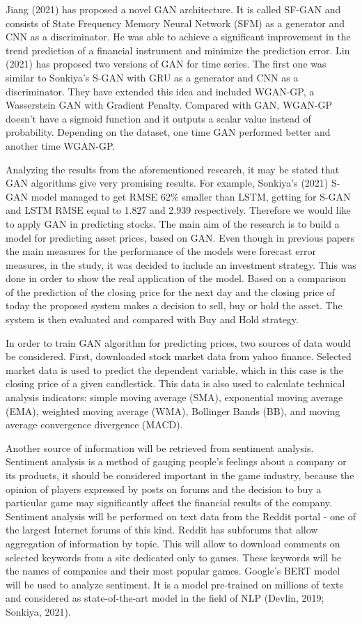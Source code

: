 \documentclass[11pt]{article} %
\begin{document}
Jiang (2021) has proposed a novel GAN architecture. It is called SF-GAN and consists of 
State Frequency Memory Neural Network (SFM) as a generator and CNN as a discriminator. 
He was able to achieve a significant improvement in the trend prediction of a financial instrument and minimize the prediction error.  Lin (2021) has proposed two versions of GAN for time series. The first one was similar to Sonkiya's S-GAN with GRU as a generator and CNN as a discriminator. They have extended this idea and included WGAN-GP, a Wasserstein GAN with Gradient Penalty. Compared with GAN, WGAN-GP doesn't have a sigmoid function and it outputs a scalar value instead of probability. Depending on the dataset, one time GAN performed better and another time WGAN-GP.

Analyzing the results from the aforementioned research, it may be stated that GAN algorithms give very promising results. For example, Sonkiya's (2021) S-GAN model managed to get RMSE 62$\% $ smaller than LSTM, getting for S-GAN and LSTM RMSE equal to 1.827 and 2.939 respectively. Therefore we would like to apply GAN in predicting stocks. The main aim of the research is to build a model for predicting asset prices, based on GAN. Even though in previous papers the main measures for the performance of the models were forecast error measures, in the study, it was decided to include an investment strategy. This was done in order to show the real application of the model. Based on a comparison of the prediction of the closing price for the next day and the closing price of today the proposed system makes a decision to sell, buy or hold the asset. The system is then evaluated and compared with Buy and Hold strategy.

In order to train GAN algorithm for predicting prices, two sources of data would be considered. First, downloaded stock market data from yahoo finance. Selected market data is used to predict the dependent variable, which in this case is the closing price of a given candlestick. This data is also used to calculate technical analysis indicators: simple moving average (SMA), exponential moving average (EMA), weighted moving average (WMA), Bollinger Bands (BB), and moving average convergence divergence (MACD). 

Another source of information will be retrieved from sentiment analysis. Sentiment analysis is a method of gauging people's feelings about a company or its products, it should be considered important in the game industry, because the opinion of players expressed by posts on forums and the decision to buy a particular game may significantly affect the financial results of the company. Sentiment analysis will be performed on text data from the Reddit portal - one of the largest Internet forums of this kind. Reddit has subforums that allow aggregation of information by topic. This will allow to download comments on selected keywords from a site dedicated only to games. These keywords will be the names of companies and their most popular games. Google's BERT model will be used to analyze sentiment. It is a model pre-trained on millions of texts and considered as state-of-the-art model in the field of NLP (Devlin, 2019; Sonkiya, 2021). 
\end{document}
